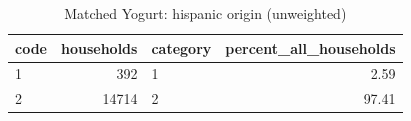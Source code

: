 \begin{table}
\caption{Matched Yogurt: hispanic origin (unweighted)}
\begin{tabular}{lrlr}
\toprule
code & households & category & percent\_all\_households \\
\midrule
1 & 392 & 1 & 2.59 \\
2 & 14714 & 2 & 97.41 \\
\bottomrule
\end{tabular}
\end{table}
